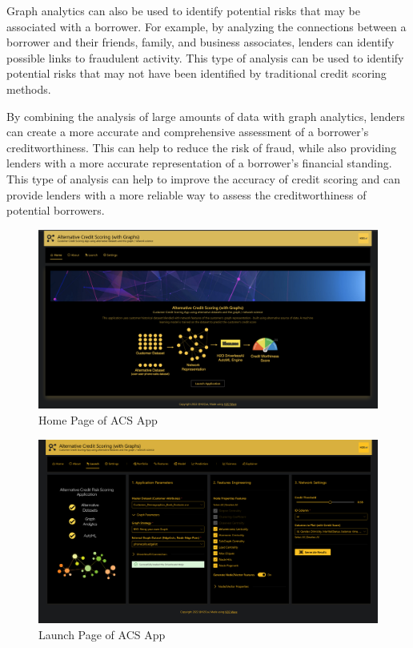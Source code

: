 \documentclass[12pt,a4paper]{report}
\begin{document}
Graph analytics can also be used to identify potential risks that may be associated with a borrower. For example, by analyzing the connections between a borrower and their friends, family, and business associates, lenders can identify possible links to fraudulent activity. This type of analysis can be used to identify potential risks that may not have been identified by traditional credit scoring methods.

By combining the analysis of large amounts of data with graph analytics, lenders can create a more accurate and comprehensive assessment of a borrower's creditworthiness. This can help to reduce the risk of fraud, while also providing lenders with a more accurate representation of a borrower's financial standing. This type of analysis can help to improve the accuracy of credit scoring and can provide lenders with a more reliable way to assess the creditworthiness of potential borrowers.

\begin{figure}[H]
\centering
\includegraphics[width=1\textwidth]{a1.png}
\caption{Home Page of ACS App}
\end{figure}

\begin{figure}[H]
\centering
\includegraphics[width=1\textwidth]{a2.png}
\caption{Launch Page of ACS App}
\end{figure}
\end{document}
